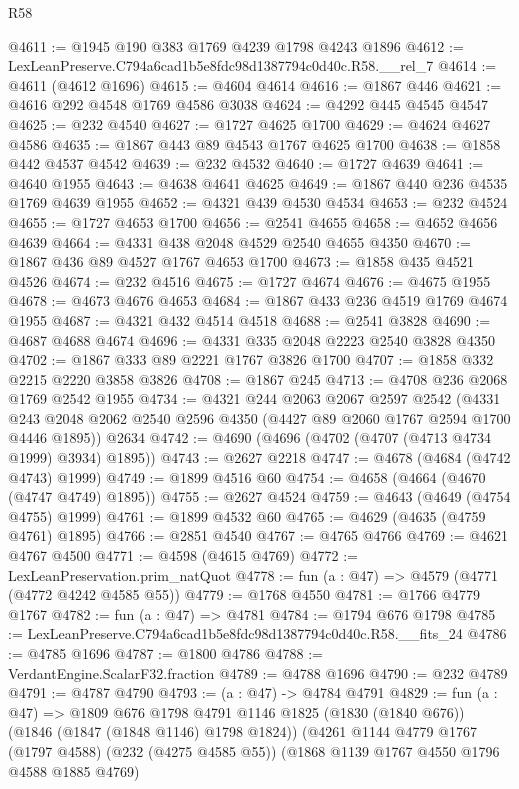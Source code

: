 \begin{lexlean}{R58}
\begin{coremodule}
@4611 := @1945 @190 @383 @1769 @4239 @1798 @4243 @1896
@4612 := LexLeanPreserve.C794a6cad1b5e8fdc98d1387794c0d40c.R58.__rel_7
@4614 := @4611 (@4612 @1696)
@4615 := @4604 @4614
@4616 := @1867 @446
@4621 := @4616 @292 @4548 @1769 @4586 @3038
@4624 := @4292 @445 @4545 @4547
@4625 := @232 @4540
@4627 := @1727 @4625 @1700
@4629 := @4624 @4627 @4586
@4635 := @1867 @443 @89 @4543 @1767 @4625 @1700
@4638 := @1858 @442 @4537 @4542
@4639 := @232 @4532
@4640 := @1727 @4639
@4641 := @4640 @1955
@4643 := @4638 @4641 @4625
@4649 := @1867 @440 @236 @4535 @1769 @4639 @1955
@4652 := @4321 @439 @4530 @4534
@4653 := @232 @4524
@4655 := @1727 @4653 @1700
@4656 := @2541 @4655
@4658 := @4652 @4656 @4639
@4664 := @4331 @438 @2048 @4529 @2540 @4655 @4350
@4670 := @1867 @436 @89 @4527 @1767 @4653 @1700
@4673 := @1858 @435 @4521 @4526
@4674 := @232 @4516
@4675 := @1727 @4674
@4676 := @4675 @1955
@4678 := @4673 @4676 @4653
@4684 := @1867 @433 @236 @4519 @1769 @4674 @1955
@4687 := @4321 @432 @4514 @4518
@4688 := @2541 @3828
@4690 := @4687 @4688 @4674
@4696 := @4331 @335 @2048 @2223 @2540 @3828 @4350
@4702 := @1867 @333 @89 @2221 @1767 @3826 @1700
@4707 := @1858 @332 @2215 @2220 @3858 @3826
@4708 := @1867 @245
@4713 := @4708 @236 @2068 @1769 @2542 @1955
@4734 := @4321
    @244
    @2063
    @2067
    @2597
    @2542
    (@4331 @243 @2048 @2062 @2540 @2596 @4350 (@4427 @89 @2060 @1767 @2594 @1700 @4446 @1895))
    @2634
@4742 := @4690 (@4696 (@4702 (@4707 (@4713 @4734 @1999) @3934) @1895))
@4743 := @2627 @2218
@4747 := @4678 (@4684 (@4742 @4743) @1999)
@4749 := @1899 @4516 @60
@4754 := @4658 (@4664 (@4670 (@4747 @4749) @1895))
@4755 := @2627 @4524
@4759 := @4643 (@4649 (@4754 @4755) @1999)
@4761 := @1899 @4532 @60
@4765 := @4629 (@4635 (@4759 @4761) @1895)
@4766 := @2851 @4540
@4767 := @4765 @4766
@4769 := @4621 @4767 @4500
@4771 := @4598 (@4615 @4769)
@4772 := LexLeanPreservation.prim_natQuot
@4778 := fun (a : @47) => @4579 (@4771 (@4772 @4242 @4585 @55))
@4779 := @1768 @4550
@4781 := @1766 @4779 @1767
@4782 := fun (a : @47) => @4781
@4784 := @1794 @676 @1798
@4785 := LexLeanPreserve.C794a6cad1b5e8fdc98d1387794c0d40c.R58.__fits_24
@4786 := @4785 @1696
@4787 := @1800 @4786
@4788 := VerdantEngine.ScalarF32.fraction
@4789 := @4788 @1696
@4790 := @232 @4789
@4791 := @4787 @4790
@4793 := (a : @47) -> @4784 @4791
@4829 := fun (a : @47) =>
  @1809
    @676
    @1798
    @4791
    @1146
    @1825
    (@1830 (@1840 @676))
    (@1846 (@1847 (@1848 @1146) @1798 @1824))
    (@4261
      @1144
      @4779
      @1767
      (@1797 @4588)
      (@232 (@4275 @4585 @55))
      (@1868 @1139 @1767 @4550 @1796 @4588 @1885 @4769)

\end{coremodule}
\end{lexlean}
